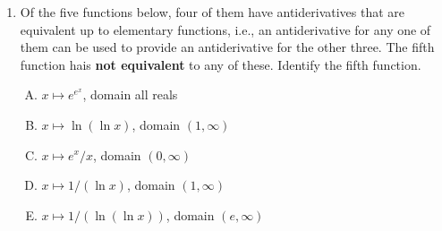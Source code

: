 \documentclass[10pt]{amsart}
\begin{document}
\begin{enumerate}
  {\em Answer}: Option (B)

  {\em Explanation}: We will show how an antiderivative for $f''(x)/x$
  is equivalent to all the antiderivatives in options (A), (C), (D),
  and (E).

  Option (A): Starting with $\int \frac{f''(x)}{x} \, dx$. Put $u =
  \ln x$. We get $\int f''(e^u) \, du$. Note that the domain now
  becomes all of $\R$. Replace the dummy variable $u$ by the dummy
  variable $x$, and we get $\int f''(e^x) \, dx$.

  Option (C): Let's start with $f'''(x)(\ln x)$. Integrate by parts
  taking $f'''(x)$ as the part to integrate. We get $\int f'''(x)(\ln
  x) \, dx = (\ln x)(f''(x)) - \int \frac{1}{x}f''(x) \, dx$. Thus, we
  see that the antiderivatives of $f'''(x)(\ln x)$ and $f''(x)/x$ add
  up to $f''(x)(\ln x)$, which is an elementarily expressible
  function, hence the antiderivatives are elementarily equivalent.

  Option (D): Start with $\int f'(1/x) \, dx$. Put $u = 1/x$ to get
  $\int \frac{-1}{u^2} f'(u)\,du$. Now integrate by parts taking
  $-1/u^2$ as the part to integrate, and we obtain a relationship with
  the integral of $f''(u)/u$.

  Option (E): Here, put $u = 1/\sqrt{x}$, so $x = 1/u^2$, giving $\int
  f(u)/u^3 \, du$. Integrate by parts twice taking the rational
  function as the part to integrate each time. We get $f''(u)/u$ (up
  to constants).

  {\em Performance review}: $8$ out of $11$ got this, $1$ each chose
  (A), (C), and (E).

  {\em Historical note}: $10$ out of $27$ people got this
  correct. $8$ people chose (C), $6$ people chose (E), and $3$ people
  chose (A).

\item Of the five functions below, four of them have antiderivatives
  that are equivalent up to elementary functions, i.e., an
  antiderivative for any one of them can be used to provide an
  antiderivative for the other three. The fifth function hais {\bf not
  equivalent} to any of these. Identify the fifth function.

  \begin{enumerate}[(A)]
  \item $x \mapsto e^{e^x}$, domain all reals
  \item $x \mapsto \ln(\ln x)$, domain $(1,\infty)$
  \item $x \mapsto e^x/x$, domain $(0,\infty)$
  \item $x \mapsto 1/(\ln x)$, domain $(1,\infty)$
  \item $x \mapsto 1/(\ln(\ln x))$, domain $(e,\infty)$
  \end{enumerate}


\end{enumerate}
\end{document}

